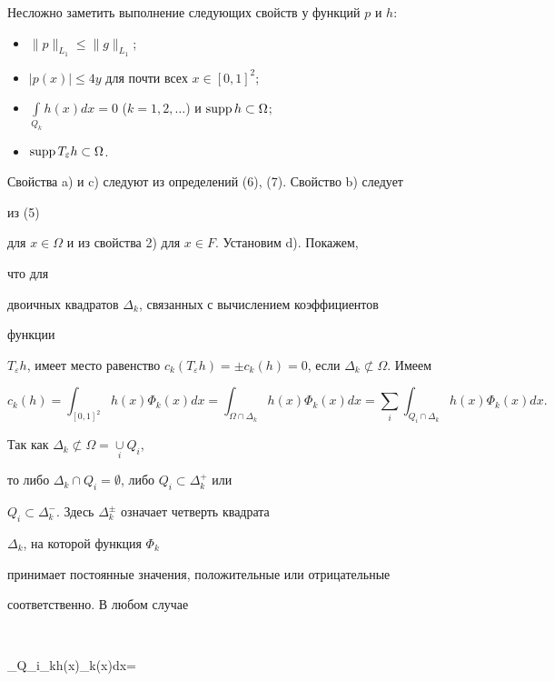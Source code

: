 Несложно заметить выполнение следующих свойств у функций $p$ и $h$: 


\begin{itemize} 


\item[a)] $\|p\|_{L_1}\le\|g\|_{L_1}$; 


\item[b)] $|p(x)|\le4y$ для почти всех $x\in[0,1]^2$; 


\item[c)] $\int\limits_{Q_k}h(x)dx=0$ ($k=1,2,\dotsc$) и $\supp 


h\subset\Omega$; 


\item[d)] $\operatorname{supp} T_\varepsilon h\subset\Omega$. 


\end{itemize} 


Свойства a) и c) следуют из определений (6), (7). Свойство b) следует 


из (5) 


для $x\in\Omega$ и из свойства 2) для $x\in F$. Установим d). Покажем, 


что для 


двоичных квадратов $\Delta_k$, связанных с вычислением коэффициентов 


функции 


$T_\varepsilon h$, имеет место равенство $c_k(T_\varepsilon h)=\pm 


c_k(h)=0$, если $\Delta_k\not\subset\Omega$. Имеем 


$$ 


c_k(h)=\int_{[0,1]^2}h(x)\Phi_k(x)dx= 


\int_{\Omega\cap\Delta_k}h(x)\Phi_k(x)dx= 


\sum_i\int_{Q_i\cap\Delta_k}h(x)\Phi_k(x)dx. 


$$ 


Так как $\Delta_k\not\subset\Omega=\underset{i}{\cup}{}Q_i$, 


то либо $\Delta_k\cap Q_i=\emptyset$, либо $Q_i\subset\Delta^+_k$ или 


$Q_i\subset\Delta^-_k$. Здесь $\Delta^\pm_k$ означает четверть квадрата 


$\Delta_k$, на которой функция $\Phi_k$ 


принимает постоянные значения, положительные или отрицательные 


соответственно. В любом случае 


$$ 


\int_{Q_i\cap\Delta_k}h(x)\Phi_k(x)dx= 


